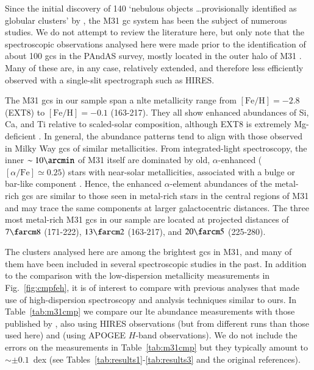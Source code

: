 \documentclass{aa}
\begin{document}
Since the initial discovery of 140 `nebulous objects \ldots provisionally identified as globular clusters' by \citet{Hubble1932}, the M31 \ac{gc} system has been the subject of numerous studies. We do not attempt to review the literature here, but only note that the spectroscopic observations analysed here were made prior to the identification of about 100 \acp{gc} in the PAndAS survey, mostly located in the outer halo of M31 \citep{Huxor2014}. Many of these are, in any case, relatively extended, and therefore less efficiently observed with a single-slit spectrograph such as HIRES. 

The M31 \acp{gc} in our sample span a \ac{nlte} metallicity range from $\mathrm{[Fe/H]}=-2.8$ (EXT8) to $\mathrm{[Fe/H]}=-0.1$ (163-217). They all show enhanced abundances of Si, Ca, and Ti relative to scaled-solar composition, although EXT8 is extremely Mg-deficient \citep{Larsen2020}. In general, the abundance patterns tend to align with those observed in Milky Way \acp{gc} of similar metallicities. 
From integrated-light spectroscopy, the inner $\sim10\arcmin$ of M31 itself are dominated by old, $\alpha$-enhanced ($[\alpha/\mathrm{Fe}]\simeq0.25$) stars with near-solar metallicities, associated with a bulge or bar-like component \citep{Saglia2009,Saglia2018}. Hence, the enhanced $\alpha$-element abundances of the metal-rich \acp{gc} are similar to those seen in metal-rich stars in the central regions of M31 and may trace the same components at larger galactocentric distances. The three most metal-rich M31 \acp{gc} in our sample are located at projected distances of $7\farcm8$ (171-222), $13\farcm2$ (163-217), and $20\farcm5$ (225-280).

The clusters analysed here are among the brightest \acp{gc} in M31, and many of them have been included in several spectroscopic studies in the past.  In addition to the comparison with the low-dispersion metallicity measurements in Fig.~\ref{fig:cmpfeh}, it is of interest to compare with previous analyses that made use of high-dispersion spectroscopy and analysis techniques similar to ours. In Table~\ref{tab:m31cmp} we compare our \ac{lte} abundance measurements with those published by \citet[][C2014]{Colucci2014}, also using HIRES observations (but from different runs than those used here) and \citet[][S2016]{Sakari2016} (using APOGEE $H$-band observations). We do not include the errors on the measurements in Table~\ref{tab:m31cmp} but they typically amount to $\sim\pm0.1$~dex (see Tables~\ref{tab:results1}-\ref{tab:results3} and the original references). 
 
\end{document}
